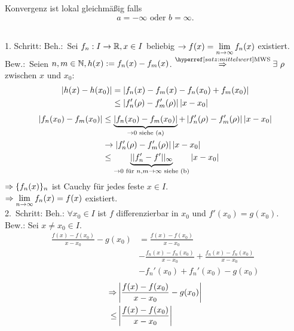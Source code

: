 \documentclass[../ana1.tex]{subfiles}
\begin{document}
\begin{bem}
    Konvergenz ist lokal gleichmäßig falls 
    \[ a = -\infty \text{ oder } b = \infty. \]
\end{bem}
\begin{bew}\hfill \\
    1. Schritt: Beh.:\ Sei \( f_n: I \rightarrow \mathbb{R}, x\in I \) 
    beliebig \( \rightarrow f(x) = \lim\limits_{n\rightarrow\infty} f_n(x) \) existiert. \\
    Bew.:\ Seien \( n,m \in \mathbb{N}, h(x) := f_n(x) - f_m(x) \).
    \( \overref{satz:mittelwert}{MWS}{\Rightarrow} 
    \exists \, \rho \) zwischen \(x\) und \(x_0\):
    \begin{align*}
        \left| h(x) - h(x_0) \right| 
        &= \left| f_n(x) - f_m(x) - f_n(x_0) + f_m(x_0) \right| \\
        &\leq \left| f_n'(\rho) - f_m'(\rho) \right|\left|x-x_0\right|
    \end{align*}
    \begin{align*}
        \left| f_n(x_0) - f_m(x_0) \right|
        &\leq 
        \underbrace{\left| f_n(x_0) - f_m(x_0) \right|}_{\rightarrow 0 \text{ siehe (a)}} 
        + \left| f_n'(\rho) 
        - f_m'(\rho) \right|\left|x-x_0\right| \\
        &\rightarrow \left| f_n'(\rho) - f_m'(\rho) \right| \left|x-x_0\right| \\
        &\leq \underbrace{||f_n' - f'||_\infty}_{\rightarrow 0 
        \text{ für } n,m \rightarrow \infty \text{ siehe (b)}} 
        \left|x-x_0\right|        
    \end{align*}
    \( \Rightarrow \{f_n(x)\}_n \) ist Cauchy für jedes feste 
    \( x\in I \). \\
    \( \Rightarrow \lim\limits_{n\rightarrow\infty} f_n(x) = f(x) \) existiert. \\
    2.\ Schritt: Beh.: \( \forall x_0 \in I \) ist \( f \) 
    differenzierbar in \(x_0\) und \( f'(x_0) = g(x_0) \). \\
    Bew.: Sei \(x \neq x_0 \in I\).
    \begin{align*}
        \frac{f(x) - f(x_0)}{x-x_0} - g(x_0)
        &= \frac{ f(x) - f(x_0) }{ x-x_0 } \\
        &- \frac{ f_n(x) - f_n(x_0) }{ x-x_0 } 
        + \frac{ f_n(x) - f_n(x_0) }{ x-x_0 } \\
        &- f_n'(x_0) + f_n'(x_0) - g(x_0)
    \end{align*}
    \begin{align*}
        \Rightarrow &\left| \frac{f(x)-f(x_0)}{x-x_0} 
        - g(x_0) \right| \\
        \leq &\left| \frac{f(x)-f(x_0)}{x-x_0} 
\right|
\end{align*}
\end{bew}
\end{document}
